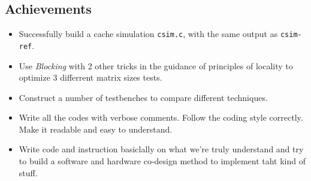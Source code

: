 \documentclass{article}
\begin{document}
\subsection{Achievements}

\begin{itemize}
	\item Successfully build a cache simulation \lstinline|csim.c|, with the same output as \lstinline|csim-ref|. 
	\item Use \textit{Blocking} with 2 other tricks in the guidance of principles of locality to optimize 3 differrent matrix sizes tests. 
	\item Construct a number of testbenches to compare different techniques.
	\item Write all the codes with verbose comments. Follow the coding style correctly. Make it readable and easy to understand.
	\item Write code and instruction basiclally on what we're truly understand and try to build a software and hardware co-design method to implement taht kind of stuff.
\end{itemize}

 







\end{document}
